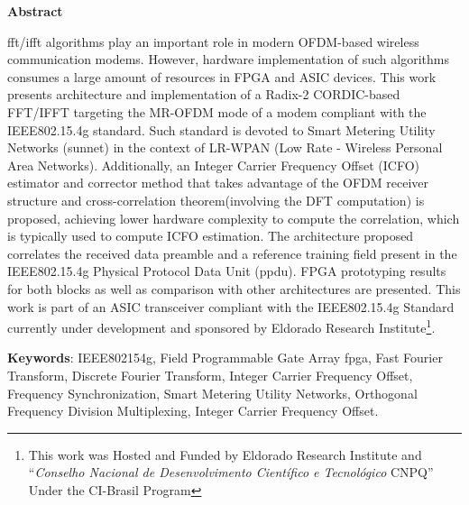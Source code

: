 \begin{center}
  \large{\textbf{Abstract}}
\end{center}

 \ac{fft}/\ac{ifft} algorithms play an important role in modern OFDM-based  wireless 
communication modems. However, hardware implementation of such algorithms consumes a large amount of resources in FPGA and ASIC devices. This work presents architecture and implementation of a Radix-2 CORDIC-based 
FFT/IFFT targeting the MR-OFDM mode of a modem compliant with the IEEE802.15.4g standard. Such standard is devoted to Smart Metering 
Utility Networks (\ac{sunnet}) in the context of LR-WPAN (Low Rate - Wireless Personal 
Area Networks). Additionally, an Integer Carrier Frequency Offset (ICFO) estimator and corrector method that takes advantage of the 
OFDM receiver structure and cross-correlation theorem(involving the DFT computation) is proposed, achieving lower hardware complexity to compute the correlation, which is typically used to compute ICFO estimation. The architecture proposed correlates the received data preamble and a reference training field present in the IEEE802.15.4g Physical Protocol Data Unit (\ac{ppdu}). FPGA prototyping results for both blocks as well as comparison with other architectures are presented. This work is part of an ASIC transceiver compliant with the IEEE802.15.4g Standard currently under development and sponsored by Eldorado Research Institute\footnote{This work was Hosted and Funded by Eldorado Research Institute and ``\textit{Conselho Nacional de Desenvolvimento Cient\'{i}fico e Tecnol\'{o}gico} CNPQ''  Under the CI-Brasil Program}.    
 \noindent




\vspace{.5cm}
\textbf{Keywords}:
IEEE802154g, Field Programmable Gate Array \ac{fpga},  Fast Fourier Transform, Discrete Fourier Transform, Integer Carrier Frequency Offset, Frequency Synchronization, Smart Metering Utility Networks, Orthogonal Frequency Division Multiplexing,  Integer Carrier Frequency Offset.
